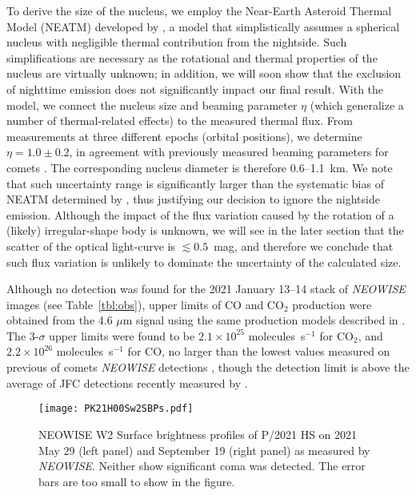 \documentclass[modern]{aastex631}
\begin{document}
\begin{CJK*}{UTF8}{gbsn}
To derive the size of the nucleus, we employ the Near-Earth Asteroid Thermal Model (NEATM) developed by \citet{Harris1998}, a model that simplistically assumes a spherical nucleus with negligible thermal contribution from the nightside. Such simplifications are necessary as the rotational and thermal properties of the nucleus are virtually unknown; in addition, we will soon show that the exclusion of nighttime emission does not significantly impact our final result. With the model, we connect the nucleus size and beaming parameter $\eta$ (which generalize a number of thermal-related effects) to the measured thermal flux. From measurements at three different epochs (orbital positions), we determine $\eta=1.0\pm0.2$, in agreement with previously measured beaming parameters for comets \citep{Fernandez2013, Bauer2017}. The corresponding nucleus diameter is therefore 0.6--1.1~km. We note that such uncertainty range is significantly larger than the systematic bias of NEATM determined by \citet[][$+11\pm8\%$]{Wolters2009}, thus justifying our decision to ignore the nightside emission. Although the impact of the flux variation caused by the rotation of a (likely) irregular-shape body is unknown, we will see in the later section that the scatter of the optical light-curve is $\lesssim0.5$~mag, and therefore we conclude that such flux variation is unlikely to dominate the uncertainty of the calculated size.

Although no detection was found for the 2021 January 13--14 stack of {\it NEOWISE} images (see Table~\ref{tbl:obs}), upper limits of CO and CO$_2$ production were obtained from the 4.6 $\mu$m signal using the same production models described in \cite{Bauer2021}. The 3-$\sigma$ upper limits were found to be $2.1\times10^{25}$ molecules~s$^{-1}$ for CO$_2$, and $2.2\times10^{26}$ molecules~s$^{-1}$ for CO, no larger than the lowest values measured on previous of comets {\it NEOWISE} detections \citep{Bauer2015}, though the detection limit is above the average of JFC detections recently measured by \citet{Pinto2022}.

\begin{figure*}
\begin{center}
\texttt{[image: PK21H00Sw2SBPs.pdf]}
\caption{NEOWISE W2 Surface brightness profiles of P/2021 HS on 2021 May 29 (left panel) and September 19 (right panel) as measured by {\it NEOWISE}. Neither show significant coma was detected. The error bars are too small to show in the figure.\label{fig:neowise-sb}}
\end{center}
\end{figure*}


\end{CJK*}
\end{document}
